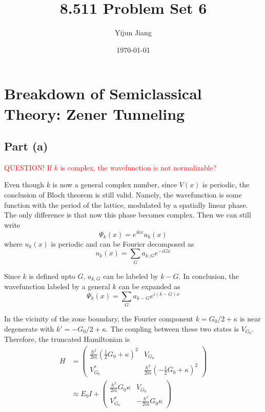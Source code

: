 \documentclass{article}
\title{8.511 Problem Set 6}
\author{Yijun Jiang}
\date{\today}
\begin{document}
\maketitle
\section{Breakdown of Semiclassical Theory: Zener Tunneling}
\subsection{Part (a)}
\textcolor{red}{QUESTION! If $k$ is complex, the wavefunction is not normalizable?}

Even though $k$ is now a general complex number, since $V(x)$ is periodic, the conclusion of Bloch theorem is still valid. Namely, the wavefunction is some function with the period of the lattice, modulated by a spatially linear phase. The only difference is that now this phase becomes complex. Then we can still write
\begin{equation*}
\Psi_k(x)=e^{ikx}u_k(x)
\end{equation*}
where $u_k(x)$ is periodic and can be Fourier decomposed as
\begin{equation*}
u_k(x)=\sum_Ga_{k,G}e^{-iGx}
\end{equation*}

Since $k$ is defined upto $G$, $a_{k,G}$ can be labeled by $k-G$. In conclusion, the wavefunction labeled by a general $k$ can be expanded as
\begin{equation*}
\Psi_k(x)=\sum_Ga_{k-G}e^{i(k-G)x}
\end{equation*}

In the vicinity of the zone boundary, the Fourier component $k=G_0/2+\kappa$ is near degenerate with $k'=-G_0/2+\kappa$. The coupling between these two states is $V_{G_0}$. Therefore, the truncated Hamiltonian is
\begin{align*}
H&=\left(\begin{array}{cc}\frac{\hbar^2}{2m}\left(\frac{1}{2}G_0+\kappa\right)^2&V_{G_0}\\V_{G_0}^*&\frac{\hbar^2}{2m}\left(-\frac{1}{2}G_0+\kappa\right)^2\end{array}\right)\\
&\approx E_0I+\left(\begin{array}{cc}\frac{\hbar^2}{2m}G_0\kappa&V_{G_0}\\V_{G_0}^*&-\frac{\hbar^2}{2m}G_0\kappa\end{array}\right)\\
\end{align*}
\end{document}
